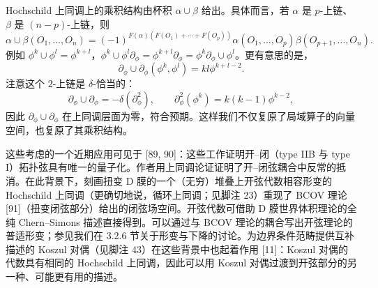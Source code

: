 Hochschild 上同调上的乘积结构由杯积 $\alpha\cup\beta$ 给出。具体而言，若 $\alpha$ 是 $p$-上链、$\beta$ 是 $(n-p)$-上链，则
\begin{equation}
  \tag{3.53}
  \alpha\cup\beta(O_1,\dots,O_n)=(-1)^{F(\alpha)(F(O_1)+\cdots+F(O_p))}\alpha(O_1,\dots,O_p)\beta(O_{p+1},\dots,O_n).
\end{equation}
例如 $\phi^k\cup\phi^l=\phi^{k+l}$，$\phi^k\cup\phi^l\partial_\phi=\phi^{k+l}\partial_\phi=\phi^k\partial_\phi\cup\phi^l$。更有意思的是，
\begin{equation}
  \tag{3.54}
  \partial_\phi\cup\partial_\phi(\phi^k,\phi^l)=kl\phi^{k+l-2}.
\end{equation}
注意这个 $2$-上链是 $\delta$-恰当的：
\begin{equation}
  \tag{3.55}
  \partial_\phi\cup\partial_\phi=-\delta(\partial_\phi^2),\qquad \partial_\phi^2(\phi^k)=k(k-1)\phi^{k-2},
\end{equation}
因此 $\partial_\phi\cup\partial_\phi$ 在上同调层面为零，符合预期。这样我们不仅复原了局域算子的向量空间，也复原了其乘积结构。

这些考虑的一个近期应用可见于 [89, 90]：这些工作证明开–闭（type IIB 与 type I）拓扑弦具有唯一的量子化。作者用上同调论证证明了开–闭弦耦合中反常的抵消。在此背景下，刻画扭变 D 膜的一个（无穷）堆叠上开弦代数相容形变的 Hochschild 上同调（更确切地说，循环上同调；见脚注 23）重现了 BCOV 理论 [91]（扭变闭弦部分）给出的闭弦场空间。开弦代数可借助 D 膜世界体积理论的全纯 Chern–Simons 描述直接得到。可以通过与 BCOV 理论的耦合写出开弦理论的普适形变；参见我们在 3.2.6 节关于形变与下降的讨论。为边界条件范畴提供互补描述的 Koszul 对偶（见脚注 43）在这些背景中也起着作用 [11]：Koszul 对偶的代数具有相同的 Hochschild 上同调，因此可以用 Koszul 对偶过渡到开弦部分的另一种、可能更有用的描述。


